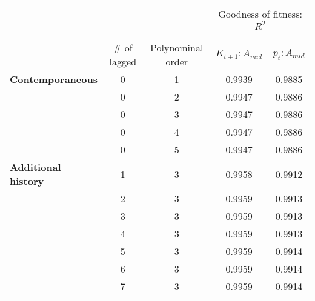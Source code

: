\begin{tabular}{lcccc}
  \toprule
 \midrule
  &&&\multicolumn{2}{c}{Goodness of fitness: $R^{2}$}\\
\\[-1.8ex]\cline{4-5}\\[-1.8ex] & $\#$ of lagged & Polynominal order & $K_{t+1}: A_{mid}$ & $p_{t}: A_{mid}$ \\ 
   \midrule
\textbf{Contemporaneous} & 0 & 1 & 0.9939 & 0.9885 \\ 
   & 0 & 2 & 0.9947 & 0.9886 \\ 
   & 0 & 3 & 0.9947 & 0.9886 \\ 
   & 0 & 4 & 0.9947 & 0.9886 \\ 
   & 0 & 5 & 0.9947 & 0.9886 \\ 
   \midrule
\textbf{Additional history} & 1 & 3 & 0.9958 & 0.9912 \\ 
   & 2 & 3 & 0.9959 & 0.9913 \\ 
   & 3 & 3 & 0.9959 & 0.9913 \\ 
   & 4 & 3 & 0.9959 & 0.9913 \\ 
   & 5 & 3 & 0.9959 & 0.9914 \\ 
   & 6 & 3 & 0.9959 & 0.9914 \\ 
   & 7 & 3 & 0.9959 & 0.9914 \\ 
   \midrule
 \bottomrule
\end{tabular}
